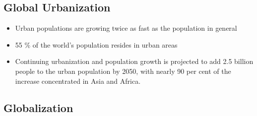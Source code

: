 \documentclass[11pt]{article}
\begin{document}
\subsection{Global Urbanization}
\begin{itemize}
\item Urban populations are growing twice as fast as the population in general
\item 55 \% of the world's population resides in urban areas
\item Continuing urbanization and  population growth is projected to add 2.5 billion people to the urban population by 2050, with nearly 90 per cent of the increase concentrated in Asia and Africa.
\end{itemize}

\subsection{Globalization}
\end{document}

